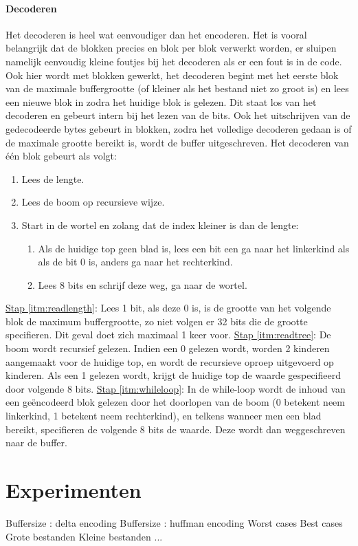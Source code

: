\documentclass[11pt, a4paper]{article}
\begin{document}
\paragraph{Decoderen}
Het decoderen is heel wat eenvoudiger dan het encoderen. Het is vooral belangrijk dat de blokken precies en blok per blok verwerkt worden, er sluipen namelijk eenvoudig kleine foutjes bij het decoderen als er een fout is in de code. Ook hier wordt met blokken gewerkt, het decoderen begint met het eerste blok van de maximale buffergrootte (of kleiner als het bestand niet zo groot is) en lees een nieuwe blok in zodra het huidige blok is gelezen. Dit staat los van het decoderen en gebeurt intern bij het lezen van de bits. Ook het uitschrijven van de gedecodeerde bytes gebeurt in blokken, zodra het volledige decoderen gedaan is of de maximale grootte bereikt is, wordt de buffer uitgeschreven. Het decoderen van \'{e}\'{e}n blok gebeurt als volgt:
\begin{enumerate}
	\item \label{itm:readlength} Lees de lengte.
	\item \label{itm:readtree} Lees de boom op recursieve wijze. 
	\item \label{itm:whileloop} Start in de wortel en zolang dat de index kleiner is dan de lengte: 
	\begin{enumerate}
		\item \label{itm:readonebit} Als de huidige top geen blad is, lees een bit een ga naar het linkerkind als als de bit 0 is, anders ga naar het rechterkind.
		\item \label{itm:readeightbit} Lees 8 bits en schrijf deze weg, ga naar de wortel.
	\end{enumerate}
\end{enumerate}	
\underline{Stap \ref{itm:readlength}}: 
Lees 1 bit, als deze 0 is, is de grootte van het volgende blok de maximum buffergrootte, zo niet volgen er 32 bits die de grootte specifieren. Dit geval doet zich maximaal 1 keer voor. 
\newline\underline{Stap \ref{itm:readtree}}:
De boom wordt recursief gelezen. Indien een 0 gelezen wordt, worden 2 kinderen aangemaakt voor de huidige top, en wordt de recursieve oproep uitgevoerd op kinderen. Als een 1 gelezen wordt, krijgt de huidige top de waarde gespecifieerd door volgende 8 bits. 
\newline\underline{Stap \ref{itm:whileloop}}:
In de while-loop wordt de inhoud van een ge\"{e}ncodeerd blok gelezen door het doorlopen van de boom (0 betekent neem linkerkind, 1 betekent neem rechterkind), en telkens wanneer men een blad bereikt, specifieren de volgende 8 bits de waarde. Deze wordt dan weggeschreven naar de buffer. 

\section{Experimenten}
Buffersize : delta encoding
Buffersize : huffman encoding
Worst cases
Best cases
Grote bestanden 
Kleine bestanden
...
\end{document}
